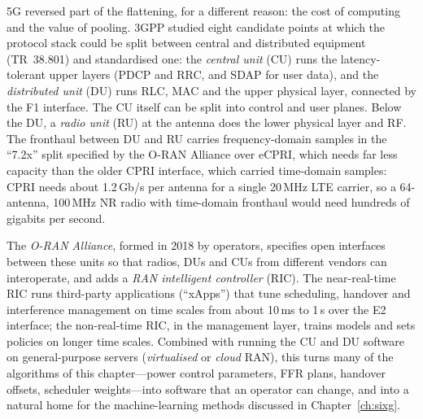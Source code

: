 5G reversed part of the flattening, for a different reason: the cost of computing and the value of pooling. 3GPP studied
eight candidate points at which the protocol stack could be split between central and distributed equipment (TR~38.801)
and standardised one: the \emph{central unit} (CU) runs the latency-tolerant upper layers (PDCP and RRC, and SDAP for user
data), and the \emph{distributed unit} (DU) runs RLC, MAC and the upper physical layer, connected by the F1 interface. The CU
itself can be split into control and user planes. Below the DU, a \emph{radio unit} (RU) at the antenna does the lower
physical layer and RF. The fronthaul between DU and RU carries frequency-domain samples in the ``7.2x'' split specified by
the O-RAN Alliance over eCPRI, which needs far less capacity than the older CPRI interface, which carried time-domain
samples: CPRI needs about 1.2\,Gb/s per antenna for a single 20\,MHz LTE carrier, so a 64-antenna, 100\,MHz NR radio with
time-domain fronthaul would need hundreds of gigabits per second.

The \emph{O-RAN Alliance}, formed in 2018 by operators, specifies open interfaces between these units so that radios,
DUs and CUs from different vendors can interoperate, and adds a \emph{RAN intelligent controller} (RIC). The near-real-time
RIC runs third-party applications (``xApps'') that tune scheduling, handover and interference management on time scales
from about 10\,ms to 1\,s over the E2 interface; the non-real-time RIC, in the management layer, trains models and sets
policies on longer time scales. Combined with running the CU and DU software on general-purpose servers (\emph{virtualised}
or \emph{cloud} RAN), this turns many of the algorithms of this chapter---power control parameters, FFR plans, handover
offsets, scheduler weights---into software that an operator can change, and into a natural home for the machine-learning
methods discussed in Chapter~\ref{ch:sixg}.



